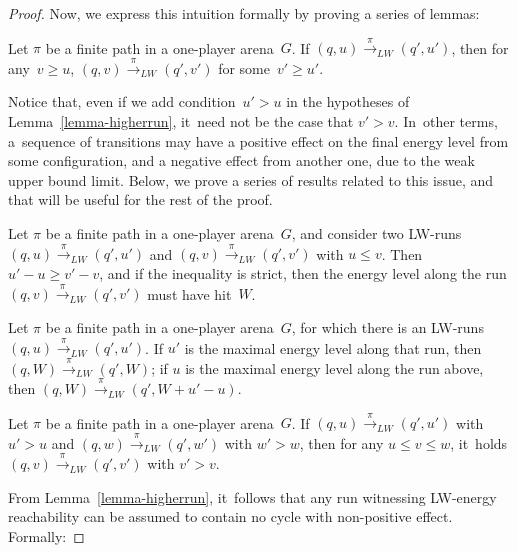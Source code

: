 \begin{proof}
  Now, we express this intuition formally by proving a series of lemmas:\\
\vskip 1cm
\begin{lemma}
\label{lemma-higherrun}
Let $\pi$ be a finite path in a one-player arena~$G$. 
If $(q,u) \xrightarrow{\pi}_{LW} (q',u')$, then for any~$v\geq u$,
$(q,v) \xrightarrow{\pi}_{LW} (q',v')$ for some~$v'\geq u'$.
\end{lemma}

Notice that, even if we add condition~$u'>u$ in the
hypotheses of Lemma~\ref{lemma-higherrun}, it~need not be the case that
$v'>v$. In~other terms, a~sequence of transitions may have a positive
effect on the final energy level from some configuration, and a negative effect from another one, due to the weak upper bound limit.
Below, we prove a series of results related to this issue, and that
will be useful for the rest of the proof.

\vskip 0.5cm
\begin{lemma}
\label{lemma-hitW}
  Let $\pi$ be a finite path in a one-player arena~$G$, and consider two LW-runs $(q,u)\xrightarrow{\pi}_{LW} (q',u')$ and $(q,v)\xrightarrow{\pi}_{LW}(q',v')$ with $u\leq
  v$. Then $u'-u\geq v'-v$, and if the inequality is strict, then
  the energy level along the run $(q,v)\xrightarrow{\pi}_{LW}(q',v')$ must have hit~$W$.
\end{lemma}

\vskip 0.5cm
\begin{lemma}
\label{lemma-W}
  Let $\pi$ be a finite path in a one-player arena~$G$, for which there
  is an LW-runs $(q,u)\xrightarrow{\pi}_{LW} (q',u')$. 
  If $u'$ is the maximal energy level along that run, then
  $(q,W)\xrightarrow{\pi}_{LW} (q',W)$;
  if $u$ is the maximal energy level along the run above, then
  $(q,W)\xrightarrow{\pi}_{LW} (q',W+u'-u)$.
\end{lemma}

\vskip 0.5cm
\begin{lemma}\label{lemma-iteratepos}
  Let $\pi$ be a finite path in a one-player arena~$G$.
  If
  $(q,u)\xrightarrow{\pi}_{LW} (q',u')$ with $u'> u$
  and 
  $(q,w)\xrightarrow{\pi}_{LW} (q',w')$ with $w'> w$,
  then
  for any $u\leq v\leq w$, it~holds
  $(q,v)\xrightarrow{\pi}_{LW} (q',v')$ with $v'> v$.
\end{lemma}

From Lemma~\ref{lemma-higherrun}, it~follows that any run witnessing
LW-energy reachability can be assumed to contain no cycle with
non-positive effect. Formally:


\end{proof}
